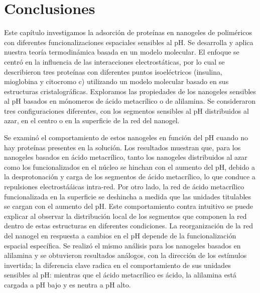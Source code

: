 \section{Conclusiones}


Este cap\'itulo investigamos la adsorci\'on de prote\'inas en nanogeles de polim\'ericos con diferentes funcionalizaciones espaciales sensibles al pH. Se desarrolla y aplica nuestra teor\'ia termodin\'amica basada en un modelo molecular.
El enfoque se centr\'o en la influencia de las interacciones electrost\'aticas, por lo cual se describieron tres prote\'inas con diferentes puntos isoel\'ectricos (insulina, mioglobina y citocromo c) utilizando un modelo molecular basado en sus estructuras cristalogr\'aficas.
Exploramos las propiedades de los nanogeles sensibles al pH basados en m\'onomeros de  \'acido metacrílico o de alilamina.
Se consideraron tres configuraciones diferentes, con los segmentos sensibles al pH distribuidos al azar, en el centro o en la superficie de la red del nanogel.

Se examin\'o el comportamiento de estos nanogeles en funci\'on del pH cuando no hay prote\'inas presentes en la soluci\'on.
Los resultados muestran que, para los nanogeles basados en \'acido metacr\'ilico, tanto los nanogeles distribuidos al azar como los funcionalizados en el n\'ucleo se hinchan con el aumento del pH, debido a la desprotonaci\'on y carga de los segmentos de \'acido metacr\'ilico, lo que conduce a repulsiones electrostá\'aicas intra-red.
Por otro lado, la red de \'acido metacr\'ilico funcionalizada en la superficie se deshincha a medida que las unidades titulables se cargan con el aumento del pH.
Este comportamiento contra intuitivo se puede explicar al observar la distribuci\'on local de los segmentos que componen la red dentro de estas estructuras en diferentes condiciones.
La reorganizaci\'on de la red del nanogel en respuesta a cambios en el pH depende de la funcionalizaci\'on espacial espec\'ifica.
Se realiz\'o el mismo an\'alisis para los nanogeles basados en alilamina y se obtuvieron resultados an\'alogos, con la direcci\'on de los est\'imulos invertida;
la diferencia clave radica en el comportamiento de sus unidades sensibles al pH: mientras que el \'acido metacr\'ilico es \'acido, la alilamina est\'a cargada a pH bajo y es neutra a pH alto.


